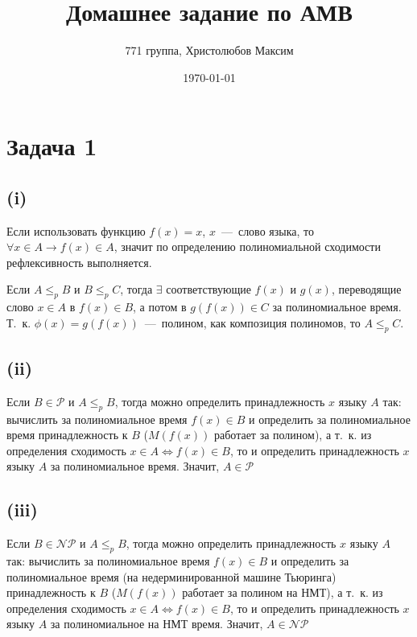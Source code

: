 \documentclass[a4paper,12pt]{article} %
\author{771 группа, Христолюбов Максим}
\title{Домашнее задание по АМВ}
\date{\today}
\begin{document}
	
	\maketitle

\section{Задача 1}
\subsection{(i)}
\hspace{5mm}
Если использовать функцию $f(x)=x$, $x$~---~слово языка, то $\forall x\in A \rightarrow f(x)\in A$, значит по определению полиномиальной сходимости рефлексивность выполняется.

Если $A\leq_p B$ и $B\leq_p C$, тогда $\exists$ соответствующие $f(x)$ и $g(x)$, переводящие слово $x\in A$ в $f(x)\in B$, а потом в $g(f(x))\in C$ за полиномиальное время. Т.~к. $\phi(x)=g(f(x))$~---~полином, как композиция полиномов, то $A\leq_p C$.
 

\subsection{(ii)}
\hspace{5mm}
Если $B\in \mathcal{P}$ и $A\leq_p B$, тогда можно определить принадлежность $x$ языку $A$ так: вычислить за полиномиальное время $f(x)\in B$ и определить за полиномиальное время принадлежность к $B$ ($M(f(x))$ работает за полином), а т.~к. из определения сходимость $x\in A \Leftrightarrow f(x)\in B$, то и определить принадлежность $x$ языку $A$ за полиномиальное время. Значит, $A\in \mathcal{P}$

\subsection{(iii)}
\hspace{5mm}
Если $B\in \mathcal{NP}$ и $A\leq_p B$, тогда можно определить принадлежность $x$ языку $A$ так: вычислить за полиномиальное время $f(x)\in B$ и определить за полиномиальное время (на недерминированной машине Тьюринга) принадлежность к $B$ ($M(f(x))$ работает за полином на НМТ), а т.~к. из определения сходимость $x\in A \Leftrightarrow f(x)\in B$, то и определить принадлежность $x$ языку $A$ за полиномиальное на НМТ время. Значит, $A\in \mathcal{NP}$
\end{document}
